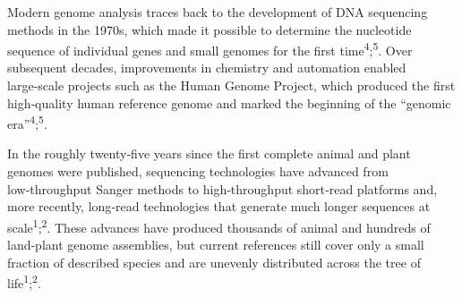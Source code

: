\documentclass[
  letterpaper,
  DIV=11,
  numbers=noendperiod]{scrreprt}
\begin{document}
Modern genome analysis traces back to the development of DNA sequencing
methods in the 1970s, which made it possible to determine the nucleotide
sequence of individual genes and small genomes for the first
time\textsuperscript{4};\textsuperscript{5}. Over subsequent decades,
improvements in chemistry and automation enabled large‑scale projects
such as the Human Genome Project, which produced the first high‑quality
human reference genome and marked the beginning of the ``genomic
era''\textsuperscript{4};\textsuperscript{5}.

In the roughly twenty‑five years since the first complete animal and
plant genomes were published, sequencing technologies have advanced from
low‑throughput Sanger methods to high‑throughput short‑read platforms
and, more recently, long‑read technologies that generate much longer
sequences at scale\textsuperscript{1};\textsuperscript{2}. These
advances have produced thousands of animal and hundreds of land‑plant
genome assemblies, but current references still cover only a small
fraction of described species and are unevenly distributed across the
tree of life\textsuperscript{1};\textsuperscript{2}.
\end{document}
